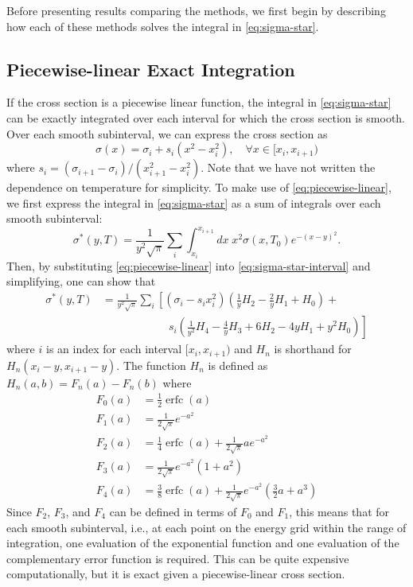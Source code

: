 \documentclass[3p,authoryear]{elsarticle}
\DeclareMathOperator\erfc{erfc}
\begin{document}
Before presenting results comparing the methods, we first begin by describing
how each of these methods solves the integral in \autoref{eq:sigma-star}.

\subsection{Piecewise-linear Exact Integration}

If the cross section is a piecewise linear function, the integral in
\autoref{eq:sigma-star} can be exactly integrated over each interval for which
the cross section is smooth. Over each smooth subinterval, we can express the
cross section as
\begin{equation}
  \label{eq:piecewise-linear}
  \sigma(x) = \sigma_i + s_i (x^2 - x_i^2), \quad \forall x \in [x_i, x_{i+1})
\end{equation}
where $s_i = (\sigma_{i+1} - \sigma_i)/(x_{i+1}^2 - x_i^2)$. Note that we have
not written the dependence on temperature for simplicity. To make use of
\autoref{eq:piecewise-linear}, we first express the integral in
\autoref{eq:sigma-star} as a sum of integrals over each smooth subinterval:
\begin{equation}
  \label{eq:sigma-star-interval}
  \sigma^* (y,T) = \frac{1}{y^2\sqrt{\pi}} \sum_i \int_{x_i}^{x_{i+1}} dx \;
  x^2 \sigma(x, T_0) e^{-(x-y)^2}.
\end{equation}
Then, by substituting \autoref{eq:piecewise-linear} into
\autoref{eq:sigma-star-interval} and simplifying, one can show that
\citep{lanl-macfarlane-2012}
\begin{align}
  \label{eq:sigma1}
  \sigma^* (y,T) &= \frac{1}{y^2\sqrt{\pi}} \sum_i \left[ \left( \sigma_i - s_i
    x_i^2 \right) \left( \frac{1}{y} H_2 - \frac{2}{y} H_1 + H_0 \right) +
    \right. \nonumber \\ & \qquad\qquad\qquad \left. s_i \left( \frac{1}{y^2}
    H_4 - \frac{4}{y} H_3 + 6 H_2 - 4y H_1 + y^2 H_0 \right) \right]
\end{align}
where $i$ is an index for each interval $[x_i, x_{i+1})$ and $H_n$ is shorthand
  for $H_n(x_i - y, x_{i+1} - y)$. The function $H_n$ is defined as $H_n(a,b) =
  F_n(a) - F_n(b)$ where
\begin{align}
  F_0(a) &= \frac{1}{2} \erfc (a) \\
  F_1(a) &= \frac{1}{2\sqrt{\pi}} e^{-a^2} \\
  F_2(a) &= \frac{1}{4} \erfc(a) + \frac{1}{2\sqrt{\pi}} ae^{-a^2} \\
  F_3(a) &= \frac{1}{2\sqrt{\pi}} e^{-a^2} \left ( 1 + a^2 \right ) \\
  F_4(a) &= \frac{3}{8} \erfc (a) + \frac{1}{2\sqrt{\pi}} e^{-a^2} \left (
  \frac{3}{2} a + a^3 \right )
\end{align}
Since $F_2$, $F_3$, and $F_4$ can be defined in terms of $F_0$ and $F_1$, this
means that for each smooth subinterval, i.e., at each point on the energy grid
within the range of integration, one evaluation of the exponential function and
one evaluation of the complementary error function is required. This can be
quite expensive computationally, but it is exact given a piecewise-linear cross
section.
\end{document}
